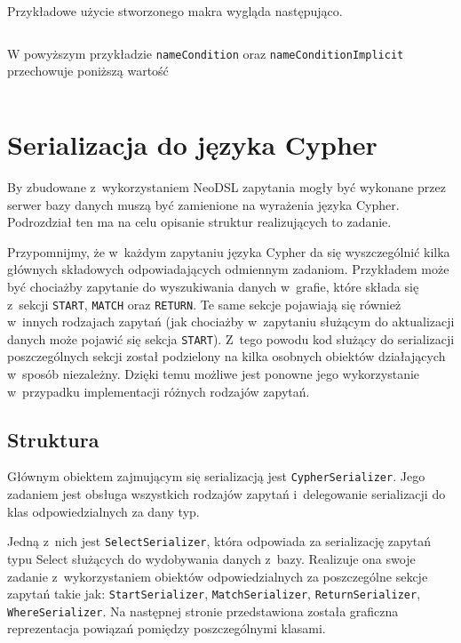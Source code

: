 \documentclass{xmgr}
\begin{document}
\medskip\noindent Przykładowe użycie stworzonego makra wygląda następująco.

\inputminted{scala}{listings/scala/macro-usage.scala}

W powyższym przykładzie \texttt{nameCondition} oraz  \texttt{nameConditionImplicit} przechowuje poniższą wartość

\inputminted{scala}{listings/scala/macro-usage-result.scala}

\section{Serializacja do języka Cypher}

By zbudowane z~wykorzystaniem NeoDSL zapytania mogły być wykonane przez serwer bazy danych muszą być zamienione na wyrażenia języka Cypher. Podrozdział ten ma na celu opisanie struktur realizujących to zadanie. 

Przypomnijmy, że w~każdym zapytaniu języka Cypher da się wyszczególnić kilka głównych składowych odpowiadających odmiennym zadaniom. Przykładem może być chociażby zapytanie do wyszukiwania danych w~grafie, które składa się z~sekcji \texttt{START}, \texttt{MATCH} oraz \texttt{RETURN}. Te same sekcje pojawiają się również w~innych rodzajach zapytań (jak chociażby w~zapytaniu służącym do aktualizacji danych może pojawić się sekcja \texttt{START}). Z~tego powodu kod służący do serializacji poszczególnych sekcji został podzielony na kilka osobnych obiektów działających w~sposób niezależny. Dzięki temu możliwe jest ponowne jego wykorzystanie w~przypadku implementacji różnych rodzajów zapytań.

\subsection{Struktura}

Głównym obiektem zajmującym się serializacją jest \texttt{CypherSerializer}. Jego zadaniem jest obsługa wszystkich rodzajów zapytań i~delegowanie serializacji do klas odpowiedzialnych za dany typ.

Jedną z~nich jest \texttt{SelectSerializer}, która odpowiada za serializację zapytań typu Select służących do wydobywania danych z~bazy. Realizuje ona swoje zadanie z~wykorzystaniem obiektów odpowiedzialnych za poszczególne sekcje zapytań takie jak: \texttt{StartSerializer}, \texttt{MatchSerializer}, \texttt{ReturnSerializer}, \texttt{WhereSerializer}. Na następnej stronie przedstawiona została graficzna reprezentacja powiązań pomiędzy poszczególnymi klasami.
\end{document}
